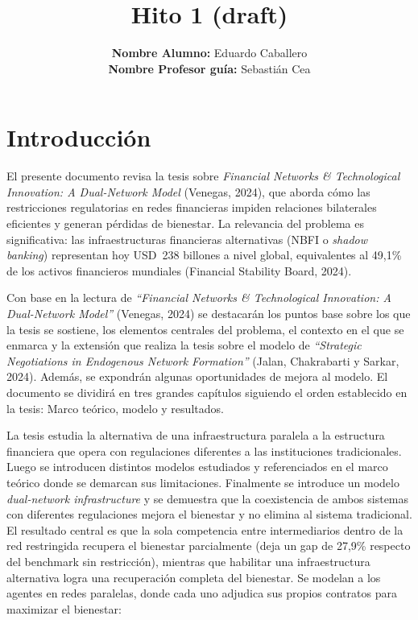 \documentclass[12pt,a4paper]{article}
\title{\textbf{Hito 1 (draft)}}
\author{
    \textbf{Nombre Alumno:} Eduardo Caballero \\
    \textbf{Nombre Profesor guía:} Sebastián Cea
}
\date{}
\begin{document}
\maketitle

\section*{Introducción}

El presente documento revisa la tesis sobre \textit{Financial Networks \& Technological
Innovation: A Dual-Network Model} (Venegas, 2024), que aborda cómo las restricciones
regulatorias en redes financieras impiden relaciones bilaterales eficientes y generan
pérdidas de bienestar. La relevancia del problema es significativa: las infraestructuras
financieras alternativas (NBFI o \textit{shadow banking}) representan hoy USD~238 billones a
nivel global, equivalentes al 49,1\% de los activos financieros mundiales (Financial
Stability Board, 2024).

Con base en la lectura de \textit{``Financial Networks \& Technological Innovation: A Dual-Network
Model''} (Venegas, 2024) se destacarán los puntos base sobre los que la tesis se sostiene, los
elementos centrales del problema, el contexto en el que se enmarca y la extensión que realiza
la tesis sobre el modelo de \textit{``Strategic Negotiations in Endogenous Network Formation''}
(Jalan, Chakrabarti y Sarkar, 2024). Además, se expondrán algunas oportunidades de mejora al modelo.
El documento se dividirá en tres grandes capítulos siguiendo el orden establecido en la tesis:
Marco teórico, modelo y resultados.

La tesis estudia la alternativa de una infraestructura paralela a la estructura financiera que
opera con regulaciones diferentes a las instituciones tradicionales. Luego se introducen
distintos modelos estudiados y referenciados en el marco teórico donde se demarcan sus
limitaciones. Finalmente se introduce un modelo \textit{dual-network infrastructure} y se
demuestra que la coexistencia de ambos sistemas con diferentes regulaciones mejora el
bienestar y no elimina al sistema tradicional. El resultado central es que la sola competencia
entre intermediarios dentro de la red restringida recupera el bienestar parcialmente (deja un
gap de 27,9\% respecto del benchmark sin restricción), mientras que habilitar una
infraestructura alternativa logra una recuperación completa del bienestar. Se modelan a los
agentes en redes paralelas, donde cada uno adjudica sus propios contratos para maximizar el
bienestar:
\end{document}

